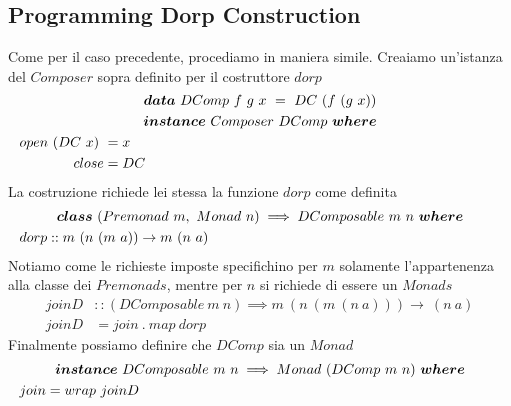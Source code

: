 \subsection{Programming Dorp Construction}
\label{programming_dorp_construction}
Come per il caso precedente, procediamo in maniera simile.
Creaiamo un'istanza del $Composer$ sopra definito per il costruttore $dorp$
\begin{align*}
  \classdef{\bm{data}\ DComp\ f\ g\ x\ =\ DC\ (f\ (g\ x))}
  \classdef{\bm{instance}\ Composer\ DComp\ \bm{where} }
  open\ (DC\ x)\ &= x\\
  close &= DC
\end{align*}
La costruzione richiede lei stessa la funzione $dorp$ come definita
\begin{align*}
  \classdef{\bm{class}\ (Premonad\ m,\ Monad\ n) \implies DComposable\ m\ n\ \bm{where}}
  dorp &:: m\ (n\ (m\ a)) \to m\ (n\ a)
\end{align*}
Notiamo come le richieste imposte specifichino per $m$ solamente l'appartenenza
alla classe dei $Premonads$, mentre per $n$ si richiede di essere un $Monads$
\begin{align*}
  joinD &:: (DComposable\ m\ n) \implies m\ (n\ (m\ (n\ a))) \to \ (n\ a)\\
  joinD &= join\ .\ map\ dorp
\end{align*}
Finalmente possiamo definire che $DComp$ sia un $Monad$
\begin{align*}
  \classdef{\bm{instance}\ DComposable\ m\ n \implies Monad\ (DComp\ m\ n)\ \bm{where}}
  join &= wrap\ joinD
\end{align*}

